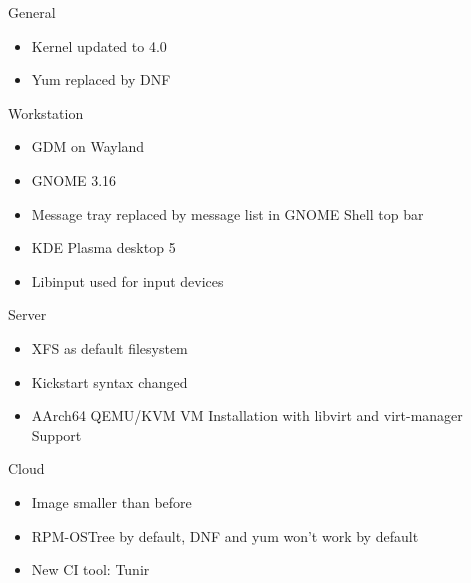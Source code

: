 \begin{frame}{General}
      \begin{itemize}
        \item Kernel updated to 4.0
        \item Yum replaced by DNF
      \end{itemize}
    \end{frame}
\begin{frame}{Workstation}
      \begin{itemize}
        \item GDM on Wayland
        \item GNOME 3.16
        \item Message tray replaced by message list in GNOME Shell top bar
        \item KDE Plasma desktop 5
        \item Libinput used for input devices
      \end{itemize}
    \end{frame}
\begin{frame}{Server}
      \begin{itemize}
        \item XFS as default filesystem
        \item Kickstart syntax changed
        \item AArch64 QEMU/KVM VM Installation with libvirt and virt-manager Support
      \end{itemize}
    \end{frame}
\begin{frame}{Cloud}
    \begin{itemize}
      \item Image smaller than before
      \item RPM-OSTree by default, DNF and yum won't work by default
      \item New CI tool: Tunir
    \end{itemize}
\end{frame}
